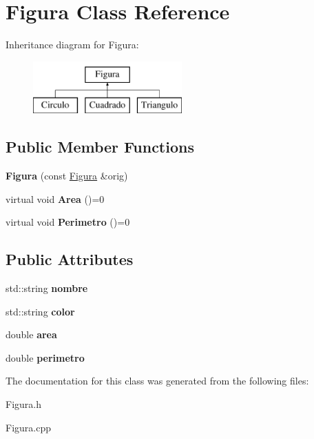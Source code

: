 \hypertarget{class_figura}{}\section{Figura Class Reference}
\label{class_figura}
Inheritance diagram for Figura\+:\begin{figure}[H]
\begin{center}
\leavevmode
\includegraphics[height=2.000000cm]{class_figura}
\end{center}
\end{figure}
\subsection*{Public Member Functions}
\begin{DoxyCompactItemize}
\item 
{\bfseries Figura} (const \hyperlink{class_figura}{Figura} \&orig)\hypertarget{class_figura_aa50330af66b067bd5e7d905075a2ccd6}{}\label{class_figura_aa50330af66b067bd5e7d905075a2ccd6}

\item 
virtual void {\bfseries Area} ()=0\hypertarget{class_figura_aa962385ee2648a5241c9ded07af162f7}{}\label{class_figura_aa962385ee2648a5241c9ded07af162f7}

\item 
virtual void {\bfseries Perimetro} ()=0\hypertarget{class_figura_a464ba53b8842754284bf552d3a1fbf26}{}\label{class_figura_a464ba53b8842754284bf552d3a1fbf26}

\end{DoxyCompactItemize}
\subsection*{Public Attributes}
\begin{DoxyCompactItemize}
\item 
std\+::string {\bfseries nombre}\hypertarget{class_figura_a67df59705ff131e5a56fe4d4af3cfb73}{}\label{class_figura_a67df59705ff131e5a56fe4d4af3cfb73}

\item 
std\+::string {\bfseries color}\hypertarget{class_figura_ab27a1a9f1236ad5ce14fce5776ed3aea}{}\label{class_figura_ab27a1a9f1236ad5ce14fce5776ed3aea}

\item 
double {\bfseries area}\hypertarget{class_figura_a80031f56cf5f383824012b2256d0334d}{}\label{class_figura_a80031f56cf5f383824012b2256d0334d}

\item 
double {\bfseries perimetro}\hypertarget{class_figura_a726780324c8107f9ac6915aa6be80966}{}\label{class_figura_a726780324c8107f9ac6915aa6be80966}

\end{DoxyCompactItemize}


The documentation for this class was generated from the following files\+:\begin{DoxyCompactItemize}
\item 
Figura.\+h\item 
Figura.\+cpp\end{DoxyCompactItemize}
